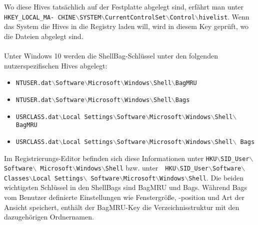 Wo diese Hives tatsächlich auf der Festplatte abgelegt sind, erfährt man unter \texttt{HKEY\_LOCAL\_MA- \newline CHINE$\backslash$SYSTEM$\backslash$CurrentControlSet$\backslash$Control$\backslash$hivelist}. Wenn das System die Hives in die Registry laden will, wird in diesem Key geprüft, wo die Dateien abgelegt sind. \cite[S.225]{anson2012mastering} \\
\\
Unter Windows 10 werden die ShellBag-Schlüssel unter den folgenden nutzerspezifischen Hives abgelegt: 
\begin{itemize}
	\item \texttt{NTUSER.dat$\backslash$Software$\backslash$Microsoft$\backslash$Windows$\backslash$Shell$\backslash$BagMRU}
	\item \texttt{NTUSER.dat$\backslash$Software$\backslash$Microsoft$\backslash$Windows$\backslash$Shell$\backslash$Bags}
	\item \texttt{USRCLASS.dat$\backslash$Local Settings$\backslash$Software$\backslash$Microsoft$\backslash$Windows$\backslash$Shell$\backslash$ \newline BagMRU}
	\item \texttt{USRCLASS.dat$\backslash$Local Settings$\backslash$Software$\backslash$Microsoft$\backslash$Windows$\backslash$Shell$\backslash$ \newline Bags} \cite[S.26]{kavrestad2018fundamentals}
\end{itemize}
Im Registrierungs-Editor befinden sich diese Informationen unter \texttt{HKU$\backslash$SID\_User$\backslash$Software$\backslash$ \newline Microsoft$\backslash$Windows$\backslash$Shell} bzw. unter\ \  \texttt{HKU$\backslash$SID\_User$\backslash$Software$\backslash$Classes$\backslash$Local Settings$\backslash$ \newline Software$\backslash$Microsoft$\backslash$Windows$\backslash$Shell}. \newline
Die beiden wichtigsten Schlüssel in den ShellBags sind \glqq BagMRU\grqq{} und \glqq Bags\grqq{}. Während \glqq Bags\grqq{} vom Benutzer definierte Einstellungen wie Fenstergröße, -position und Art der Ansicht speichert, enthält der \glqq BagMRU\grqq{}-Key die Verzeichnisstruktur mit den dazugehörigen Ordnernamen. \cite{lo2014windows} 

